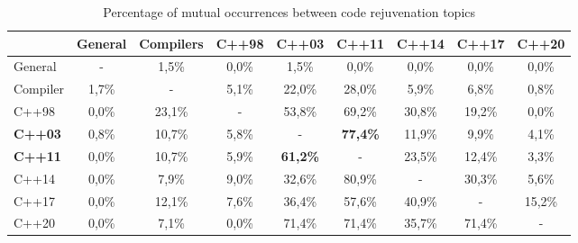 \begin{table}
\caption{Percentage of mutual occurrences between code rejuvenation topics}
  \label{tab:mut_occurr_prop}
\begin{tabular}{@{}lcccccccc@{}}
\toprule
                                    & \multicolumn{1}{l}{General} & \multicolumn{1}{l}{Compilers} & \multicolumn{1}{l}{C++98} & \multicolumn{1}{l}{\textbf{C++03}} & \multicolumn{1}{l}{\textbf{C++11}} & \multicolumn{1}{l}{C++14} & \multicolumn{1}{l}{C++17} & \multicolumn{1}{l}{C++20} \\ \midrule
\multicolumn{1}{l|}{General}        & -                           & 1,5\%                         & 0,0\%                     & 1,5\%                              & 0,0\%                              & 0,0\%                     & 0,0\%                     & 0,0\%                     \\
\multicolumn{1}{l|}{Compiler}      & 1,7\%                       & -                             & 5,1\%                     & 22,0\%                             & 28,0\%                             & 5,9\%                     & 6,8\%                     & 0,8\%                     \\
\multicolumn{1}{l|}{C++98}          & 0,0\%                       & 23,1\%                        & -                         & 53,8\%                             & 69,2\%                             & 30,8\%                    & 19,2\%                    & 0,0\%                     \\
\multicolumn{1}{l|}{\textbf{C++03}} & 0,8\%                       & 10,7\%                        & 5,8\%                     & -                                  & \textbf{77,4\%}                    & 11,9\%                    & 9,9\%                     & 4,1\%                     \\
\multicolumn{1}{l|}{\textbf{C++11}} & 0,0\%                       & 10,7\%                        & 5,9\%                     & \textbf{61,2\%}                    & -                                  & 23,5\%                    & 12,4\%                    & 3,3\%                     \\
\multicolumn{1}{l|}{C++14}          & 0,0\%                       & 7,9\%                         & 9,0\%                     & 32,6\%                             & 80,9\%                             & -                         & 30,3\%                    & 5,6\%                     \\
\multicolumn{1}{l|}{C++17}          & 0,0\%                       & 12,1\%                        & 7,6\%                     & 36,4\%                             & 57,6\%                             & 40,9\%                    & -                         & 15,2\%                    \\
\multicolumn{1}{l|}{C++20}          & 0,0\%                       & 7,1\%                         & 0,0\%                     & 71,4\%                             & 71,4\%                             & 35,7\%                    & 71,4\%                    & -                         \\ \bottomrule
\end{tabular}
\end{table}


